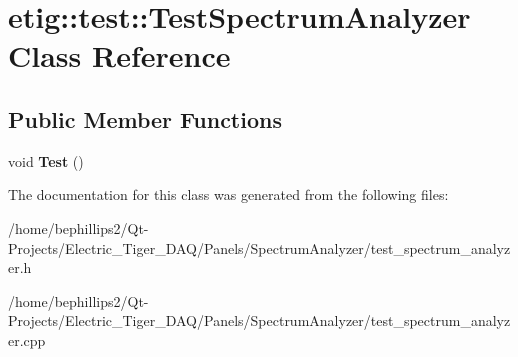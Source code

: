 \hypertarget{classetig_1_1test_1_1_test_spectrum_analyzer}{}\section{etig\+:\+:test\+:\+:Test\+Spectrum\+Analyzer Class Reference}
\label{classetig_1_1test_1_1_test_spectrum_analyzer}
\subsection*{Public Member Functions}
\begin{DoxyCompactItemize}
\item 
void {\bfseries Test} ()\hypertarget{classetig_1_1test_1_1_test_spectrum_analyzer_ab09e54d9caf626da632d0bb52c223b1c}{}\label{classetig_1_1test_1_1_test_spectrum_analyzer_ab09e54d9caf626da632d0bb52c223b1c}

\end{DoxyCompactItemize}


The documentation for this class was generated from the following files\+:\begin{DoxyCompactItemize}
\item 
/home/bephillips2/\+Qt-\/\+Projects/\+Electric\+\_\+\+Tiger\+\_\+\+D\+A\+Q/\+Panels/\+Spectrum\+Analyzer/test\+\_\+spectrum\+\_\+analyzer.\+h\item 
/home/bephillips2/\+Qt-\/\+Projects/\+Electric\+\_\+\+Tiger\+\_\+\+D\+A\+Q/\+Panels/\+Spectrum\+Analyzer/test\+\_\+spectrum\+\_\+analyzer.\+cpp\end{DoxyCompactItemize}
